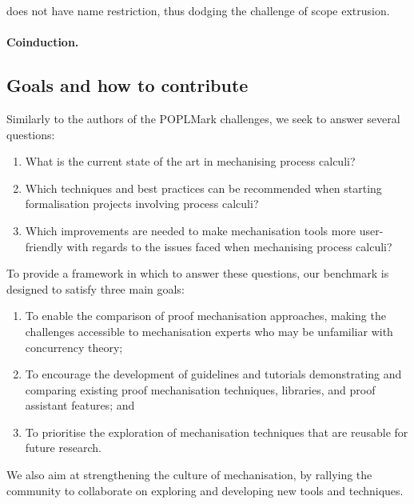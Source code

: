 \documentclass[runningheads]{llncs}
\begin{document}
\cite{Maksimovic2015} does not have name restriction, thus dodging the challenge of scope extrusion.

\paragraph{Coinduction.} \todo{}


\subsection{Goals and how to contribute}
Similarly to the authors of the POPLMark challenges, we seek to
answer several questions:
\begin{enumerate}[label=\textbf{(Q\arabic*)},leftmargin=10mm]
\item\label{item:rq1} What is the current state of the art in mechanising process calculi?
\item\label{item:rq2} Which techniques and best practices can be recommended when starting formalisation projects involving process calculi?
\item\label{item:rq3} Which improvements are needed to make mechanisation tools more user-friendly with regards to the issues faced when mechanising process calculi?
\end{enumerate}

To provide a framework in which to answer these questions, our benchmark is designed to satisfy three main goals:
\begin{enumerate}[label=\textbf{(G\arabic*)},leftmargin=10mm]
\item\label{item:goal-comperison-accessibility} To enable the comparison of
  proof mechanisation approaches, making the challenges accessible to
  mechanisation experts who may be unfamiliar with concurrency theory;

\item\label{item:goal-tutorials} To encourage the development of guidelines and
  tutorials demonstrating and comparing existing proof mechanisation
  techniques, libraries, and proof assistant features; and

\item\label{item:goal-reusability} To prioritise the exploration of mechanisation
  techniques that are reusable for future research.
\end{enumerate}
We also aim at strengthening the culture of mechanisation, by rallying the community to collaborate on exploring and developing new tools and techniques.
\end{document}
